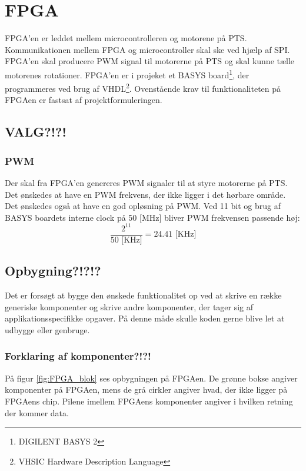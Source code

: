 \section{FPGA}
\label{sec:FPGA}
FPGA'en er leddet mellem microcontrolleren og motorene på PTS. 
Kommunikationen mellem FPGA og microcontroller skal ske ved hjælp af SPI. 
FPGA'en skal producere PWM signal til motorerne på PTS og skal kunne tælle motorenes rotationer. 
FPGA'en er i projeket et BASYS board\footnote{DIGILENT BASYS 2}, der programmeres ved brug af VHDL\footnote{VHSIC Hardware Description Language}.
Ovenstående krav til funktionaliteten på FPGAen er fastsat af 
projektformuleringen.


\subsection{VALG?!?!}
\subsubsection*{PWM}
Der skal fra FPGA'en genereres PWM signaler til at styre motorerne på PTS.
Det ønskedes at have en PWM frekvens, der ikke ligger i det hørbare område. 
Det ønskedes også at have en god opløsning på PWM. 
Ved 11 bit og brug af BASYS boardets interne clock på 50 [MHz] bliver PWM frekvensen passende høj:
\begin{equation}
  \frac{2^{11}}{50  \text{ [KHz]}} = 24.41 \text{ [KHz]} 
\end{equation}

\subsection{Opbygning?!?!?}
Det er forsøgt at bygge den ønskede funktionalitet op ved at skrive en række generiske komponenter og skrive andre komponenter, der tager sig af applikationsspecifikke opgaver. 
På denne måde skulle koden gerne blive let at udbygge eller genbruge. 
\subsubsection*{Forklaring af komponenter?!?!}
På figur \ref{fig:FPGA_blok} ses opbygningen på FPGAen. De grønne bokse angiver 
komponenter på FPGAen, mens de grå cirkler angiver hvad, der ikke ligger på 
FPGAens chip. Pilene imellem FPGAens komponenter angiver i hvilken retning der 
kommer data.



